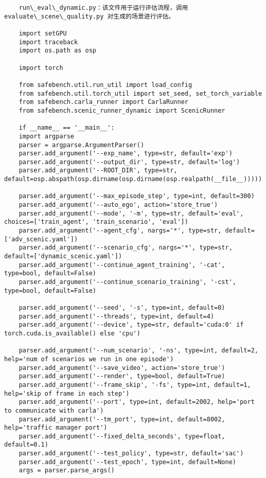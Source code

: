 \begin{lstlisting}
	run\_eval\_dynamic.py：该文件用于运行评估流程，调用evaluate\_scene\_quality.py 对生成的场景进行评估。
	
	import setGPU
	import traceback
	import os.path as osp
	
	import torch 
	
	from safebench.util.run_util import load_config
	from safebench.util.torch_util import set_seed, set_torch_variable
	from safebench.carla_runner import CarlaRunner
	from safebench.scenic_runner_dynamic import ScenicRunner
	
	if __name__ == '__main__':
	import argparse
	parser = argparse.ArgumentParser()
	parser.add_argument('--exp_name', type=str, default='exp')
	parser.add_argument('--output_dir', type=str, default='log')
	parser.add_argument('--ROOT_DIR', type=str, default=osp.abspath(osp.dirname(osp.dirname(osp.realpath(__file__)))))
	
	parser.add_argument('--max_episode_step', type=int, default=300)
	parser.add_argument('--auto_ego', action='store_true')
	parser.add_argument('--mode', '-m', type=str, default='eval', choices=['train_agent', 'train_scenario', 'eval'])
	parser.add_argument('--agent_cfg', nargs='*', type=str, default=['adv_scenic.yaml'])
	parser.add_argument('--scenario_cfg', nargs='*', type=str, default=['dynamic_scenic.yaml'])
	parser.add_argument('--continue_agent_training', '-cat', type=bool, default=False)
	parser.add_argument('--continue_scenario_training', '-cst', type=bool, default=False)
	
	parser.add_argument('--seed', '-s', type=int, default=0)
	parser.add_argument('--threads', type=int, default=4)
	parser.add_argument('--device', type=str, default='cuda:0' if torch.cuda.is_available() else 'cpu')   
	
	parser.add_argument('--num_scenario', '-ns', type=int, default=2, help='num of scenarios we run in one episode')
	parser.add_argument('--save_video', action='store_true')
	parser.add_argument('--render', type=bool, default=True)
	parser.add_argument('--frame_skip', '-fs', type=int, default=1, help='skip of frame in each step')
	parser.add_argument('--port', type=int, default=2002, help='port to communicate with carla')
	parser.add_argument('--tm_port', type=int, default=8002, help='traffic manager port')
	parser.add_argument('--fixed_delta_seconds', type=float, default=0.1)
	parser.add_argument('--test_policy', type=str, default='sac')
	parser.add_argument('--test_epoch', type=int, default=None)
	args = parser.parse_args()
	

\end{lstlisting}
